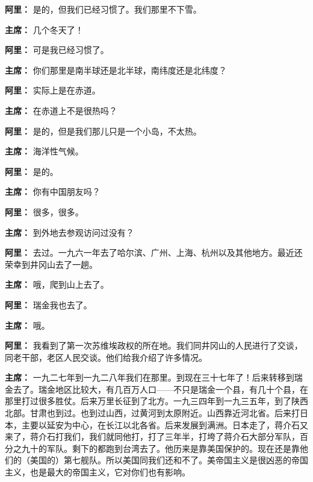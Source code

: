 \begin{duihua}
\item[\textbf{阿里：}] 是的，但我们已经习惯了。我们那里不下雪。

\item[\textbf{主席：}] 几个冬天了！

\item[\textbf{阿里：}] 可是我已经习惯了。

\item[\textbf{主席：}] 你们那里是南半球还是北半球，南纬度还是北纬度？

\item[\textbf{阿里：}] 实际上是在赤道。

\item[\textbf{主席：}] 在赤道上不是很热吗？

\item[\textbf{阿里：}] 是的，但是我们那儿只是一个小岛，不太热。

\item[\textbf{主席：}] 海洋性气候。

\item[\textbf{阿里：}] 是的。

\item[\textbf{主席：}] 你有中国朋友吗？

\item[\textbf{阿里：}] 很多，很多。

\item[\textbf{主席：}] 到外地去参观访问过没有？

\item[\textbf{阿里：}] 去过。一九六一年去了哈尔滨、广州、上海、杭州以及其他地方。最近还荣幸到井冈山去了一趟。

\item[\textbf{主席：}] 哦，爬到山上去了。

\item[\textbf{阿里：}] 瑞金我也去了。

\item[\textbf{主席：}] 哦。

\item[\textbf{阿里：}] 我看到了第一次苏维埃政权的所在地。我们同井冈山的人民进行了交谈，同老干部，老区人民交谈。他们给我介绍了许多情况。

\item[\textbf{主席：}] 一九二七年到一九二八年我们在那里。到现在三十七年了！后来转移到瑞金去了。瑞金地区比较大，有几百万人口——不只是瑞金一个县，有几十个县，在那里打过很多胜仗。后来万里长征到了北方。一九三四年到一九三五年，到了陕西北部。甘肃也到过。也到过山西，过黄河到太原附近。山西靠近河北省。后来打日本，主要以延安为中心，在长江以北各省。后来发展到满洲。日本走了，蒋介石又来了，蒋介石打我们，我们就同他打，打了三年半，打垮了蒋介石大部分军队，百分之九十的军队。剩下的都跑到台湾去了。他历来是靠美国保护的。现在还是靠他们的（美国的）第七舰队。所以美国同我们还和不了。美帝国主义是很凶恶的帝国主义，也是最大的帝国主义，它对你们也有影响。


\end{duihua}
